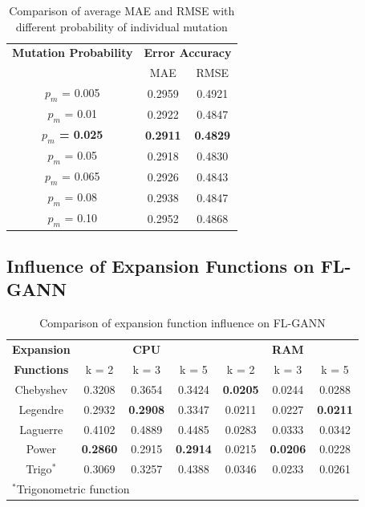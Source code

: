 \documentclass[conference]{IEEEtran}
\begin{document}
\begin{table}[h]
\caption{Comparison of average MAE and RMSE with different probability of individual mutation} 
\begin{center}
\begin{tabular}{| c | c| c |}
\hline
\textbf{Mutation Probability} & \multicolumn{2}{c|}{\textbf{Error Accuracy}}  \\ \cline{2-3} 
& MAE & RMSE \\ [0.5ex] \hline
$p_m$ = 0.005	& 0.2959	& 0.4921	\\ \hline
$p_m$ = 0.01	& 0.2922	& 0.4847	\\ \hline
\textbf{$p_m$ = 0.025}	& \textbf{0.2911}	& \textbf{0.4829}	\\ \hline
$p_m$ = 0.05	& 0.2918	& 0.4830	\\ \hline
$p_m$ = 0.065	& 0.2926	& 0.4843	\\ \hline
$p_m$ = 0.08	& 0.2938	& 0.4847	\\ \hline
$p_m$ = 0.10	& 0.2952	& 0.4868	\\ \hline
\end{tabular}
\label{table:probability_mutation}
\end{center}
\end{table}

\subsection{Influence of Expansion Functions on FL-GANN}
\label{influence2}

\begin{table}[h]
	\caption{Comparison of expansion function influence on FL-GANN} 
	\begin{center}
		\begin{tabular}{| c | c| c | c | c | c | c |}
			\hline
			\textbf{Expansion} & \multicolumn{3}{c|}{\textbf{CPU}}  & \multicolumn{3}{c|}{\textbf{RAM}}  \\ \cline{2-7} 
			\textbf{Functions} & k = 2 & k = 3 & k = 5 & k = 2 & k = 3 & k = 5 \\ [0.5ex] \hline
			Chebyshev  & 0.3208	&  0.3654	& 0.3424  & \textbf{0.0205} & 0.0244 & 0.0288  \\ \hline
			Legendre & 0.2932	& \textbf{0.2908}	  	& 0.3347  & 0.0211 & 0.0227 & \textbf{0.0211}   \\ \hline 
			Laguerre & 0.4102	& 0.4889 	& 0.4485   & 0.0283 & 0.0333 & 0.0342  \\ \hline
			Power & \textbf{0.2860}	& 0.2915	 	& \textbf{0.2914}  & 0.0215 & \textbf{0.0206} & 0.0228  \\  \hline
			Trigo$^*$ & 0.3069	& 0.3257		& 0.4388   & 0.0346 & 0.0233 & 0.0261  \\ \hline
			\multicolumn{7}{l}{$^*$Trigonometric function}
		\end{tabular}
		\label{table:changing_expansion_functions}
	\end{center}
\end{table}
\end{document}
